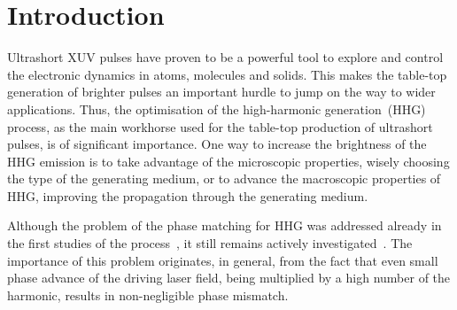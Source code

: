 %
\section{Introduction}
%
Ultrashort XUV pulses have proven to be a powerful tool to explore and control the electronic dynamics in atoms, molecules and solids. This makes the table-top generation of brighter pulses an important hurdle to jump on the way to wider applications. Thus, the optimisation of the high-harmonic generation~(HHG) process, as the main workhorse used for the table-top production of ultrashort pulses, is of significant importance. One way to increase the brightness of the HHG emission is to take advantage of the microscopic properties, wisely choosing the type of the generating medium, or to advance the macroscopic properties of HHG, improving the propagation through the generating medium.

Although the problem of the phase matching for HHG was addressed already in the first studies of the process~\cite{Balcou1993, Salieres1995, Balcou1997,Constant,Rundquist1998}, it still remains actively investigated~\cite{Weissenbilder2022, Minneker2023, Finke2022, Boyero-Garci2021, Hareli2020, Fu2022}. The importance of this problem originates, in general, from the fact that even small phase advance of the driving laser field, being multiplied by a high number of the harmonic, results in non-negligible phase mismatch. 

